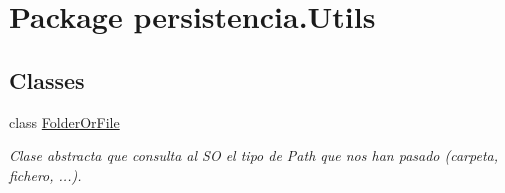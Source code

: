\hypertarget{namespacepersistencia_1_1Utils}{}\section{Package persistencia.\+Utils}
\label{namespacepersistencia_1_1Utils}
\subsection*{Classes}
\begin{DoxyCompactItemize}
\item 
class \hyperlink{classpersistencia_1_1Utils_1_1FolderOrFile}{Folder\+Or\+File}
\begin{DoxyCompactList}\small\item\em Clase abstracta que consulta al SO el tipo de Path que nos han pasado (carpeta, fichero, ...). \end{DoxyCompactList}\end{DoxyCompactItemize}

